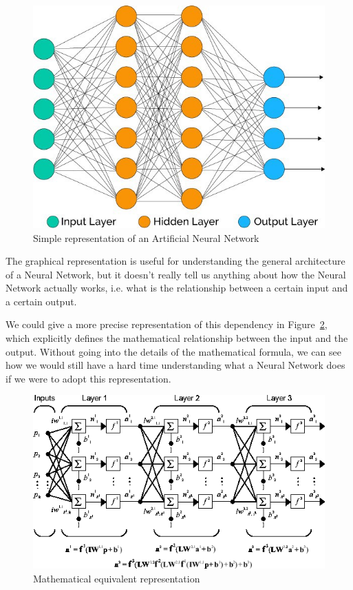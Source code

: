 \documentclass[conference]{IEEEtran}
\begin{document}
\begin{figure}[ht!] \centering \includegraphics[width=0.8
        \linewidth]{images/nn}
    \caption{Simple representation of an Artificial Neural Network} \label{fig:nn} \end{figure}

The graphical representation is useful for understanding the general architecture of a Neural Network, but it doesn't really tell us anything about how the Neural Network actually works, i.e. what is the relationship between a certain input and a certain output.

We could give a more precise representation of this dependency in Figure~\ref{fig:mathnn}, which explicitly defines the mathematical relationship between the input and the output. Without going into the details of the mathematical formula, we can see how we would still have a hard time understanding what a Neural Network does if we were to adopt this representation.

\begin{figure}[ht!] \centering \includegraphics[width=0.9\linewidth]{images/nmodel}
    \caption{Mathematical equivalent representation} \label{fig:mathnn} \end{figure}
\end{document}
